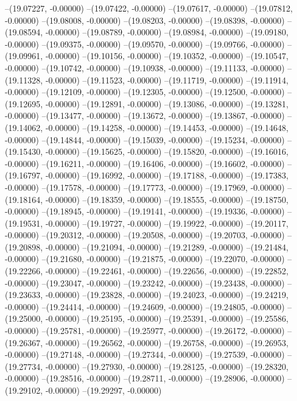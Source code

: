 --(19.07227, -0.00000)
--(19.07422, -0.00000)
--(19.07617, -0.00000)
--(19.07812, -0.00000)
--(19.08008, -0.00000)
--(19.08203, -0.00000)
--(19.08398, -0.00000)
--(19.08594, -0.00000)
--(19.08789, -0.00000)
--(19.08984, -0.00000)
--(19.09180, -0.00000)
--(19.09375, -0.00000)
--(19.09570, -0.00000)
--(19.09766, -0.00000)
--(19.09961, -0.00000)
--(19.10156, -0.00000)
--(19.10352, -0.00000)
--(19.10547, -0.00000)
--(19.10742, -0.00000)
--(19.10938, -0.00000)
--(19.11133, -0.00000)
--(19.11328, -0.00000)
--(19.11523, -0.00000)
--(19.11719, -0.00000)
--(19.11914, -0.00000)
--(19.12109, -0.00000)
--(19.12305, -0.00000)
--(19.12500, -0.00000)
--(19.12695, -0.00000)
--(19.12891, -0.00000)
--(19.13086, -0.00000)
--(19.13281, -0.00000)
--(19.13477, -0.00000)
--(19.13672, -0.00000)
--(19.13867, -0.00000)
--(19.14062, -0.00000)
--(19.14258, -0.00000)
--(19.14453, -0.00000)
--(19.14648, -0.00000)
--(19.14844, -0.00000)
--(19.15039, -0.00000)
--(19.15234, -0.00000)
--(19.15430, -0.00000)
--(19.15625, -0.00000)
--(19.15820, -0.00000)
--(19.16016, -0.00000)
--(19.16211, -0.00000)
--(19.16406, -0.00000)
--(19.16602, -0.00000)
--(19.16797, -0.00000)
--(19.16992, -0.00000)
--(19.17188, -0.00000)
--(19.17383, -0.00000)
--(19.17578, -0.00000)
--(19.17773, -0.00000)
--(19.17969, -0.00000)
--(19.18164, -0.00000)
--(19.18359, -0.00000)
--(19.18555, -0.00000)
--(19.18750, -0.00000)
--(19.18945, -0.00000)
--(19.19141, -0.00000)
--(19.19336, -0.00000)
--(19.19531, -0.00000)
--(19.19727, -0.00000)
--(19.19922, -0.00000)
--(19.20117, -0.00000)
--(19.20312, -0.00000)
--(19.20508, -0.00000)
--(19.20703, -0.00000)
--(19.20898, -0.00000)
--(19.21094, -0.00000)
--(19.21289, -0.00000)
--(19.21484, -0.00000)
--(19.21680, -0.00000)
--(19.21875, -0.00000)
--(19.22070, -0.00000)
--(19.22266, -0.00000)
--(19.22461, -0.00000)
--(19.22656, -0.00000)
--(19.22852, -0.00000)
--(19.23047, -0.00000)
--(19.23242, -0.00000)
--(19.23438, -0.00000)
--(19.23633, -0.00000)
--(19.23828, -0.00000)
--(19.24023, -0.00000)
--(19.24219, -0.00000)
--(19.24414, -0.00000)
--(19.24609, -0.00000)
--(19.24805, -0.00000)
--(19.25000, -0.00000)
--(19.25195, -0.00000)
--(19.25391, -0.00000)
--(19.25586, -0.00000)
--(19.25781, -0.00000)
--(19.25977, -0.00000)
--(19.26172, -0.00000)
--(19.26367, -0.00000)
--(19.26562, -0.00000)
--(19.26758, -0.00000)
--(19.26953, -0.00000)
--(19.27148, -0.00000)
--(19.27344, -0.00000)
--(19.27539, -0.00000)
--(19.27734, -0.00000)
--(19.27930, -0.00000)
--(19.28125, -0.00000)
--(19.28320, -0.00000)
--(19.28516, -0.00000)
--(19.28711, -0.00000)
--(19.28906, -0.00000)
--(19.29102, -0.00000)
--(19.29297, -0.00000)
